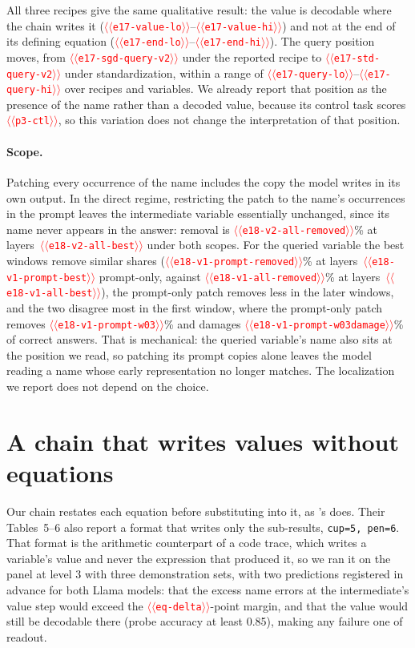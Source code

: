 \documentclass[11pt]{article}
\providecommand{\NUM}[1]{\textcolor{red}{$\langle\langle$\texttt{#1}$\rangle\rangle$}}
\providecommand{\tabinput}[1]{\IfFileExists{tables/#1.tex}{}{\textcolor{red}{[table \texttt{#1} not generated yet]}}}
\begin{document}
\begin{table}[h]
\centering\small
\resizebox{\columnwidth}{!}{\tabinput{recipe}}
\caption{Best-layer accuracy for the true value, neutral instances, under three probe recipes.}
\label{tab:recipe}
\end{table}

All three recipes give the same qualitative result: the value is decodable where the chain writes it
(\NUM{e17-value-lo}--\NUM{e17-value-hi}) and not at the end of its defining equation
(\NUM{e17-end-lo}--\NUM{e17-end-hi}). The query position moves, from \NUM{e17-sgd-query-v2}
under the reported recipe to \NUM{e17-std-query-v2} under standardization, within a range of
\NUM{e17-query-lo}--\NUM{e17-query-hi} over recipes and variables. We already report that
position as the presence of the name rather than a decoded value, because its control task
scores \NUM{p3-ctl}, so this variation does not change the interpretation of that position.

\paragraph{Scope.} Patching every occurrence of the name includes the copy the model writes in
its own output. In the direct regime, restricting the patch to the name's occurrences in the prompt leaves the
intermediate variable essentially unchanged, since its name never appears in the answer: removal is
\NUM{e18-v2-all-removed}\% at layers~\NUM{e18-v2-all-best} under both scopes. For the queried
variable the best windows remove similar shares (\NUM{e18-v1-prompt-removed}\% at
layers~\NUM{e18-v1-prompt-best} prompt-only, against \NUM{e18-v1-all-removed}\% at
layers~\NUM{e18-v1-all-best}), the prompt-only patch removes less in the later windows, and the
two disagree most in the first window, where the prompt-only patch removes
\NUM{e18-v1-prompt-w03}\% and damages \NUM{e18-v1-prompt-w03damage}\% of correct answers. That
is mechanical: the queried variable's name also sits at the position we read, so patching its
prompt copies alone leaves the model reading a name whose early representation no longer
matches. The localization we report does not depend on the choice.

\section{A chain that writes values without equations}
\label{app:simple}

Our chain restates each equation before substituting into it, as
\citeauthor{kudo2026faithful}'s does. Their Tables~5--6 also report a format that writes only the
sub-results, \texttt{cup=5, pen=6}. That format is the arithmetic counterpart of a code trace,
which writes a variable's value and never the expression that produced it, so we ran it on the
panel at level 3 with three demonstration sets, with two predictions registered in advance for both Llama models: that
the excess name errors at the intermediate's value step would exceed the \NUM{eq-delta}-point
margin, and that the value would still be decodable there (probe accuracy at least 0.85), making
any failure one of readout.
\end{document}
